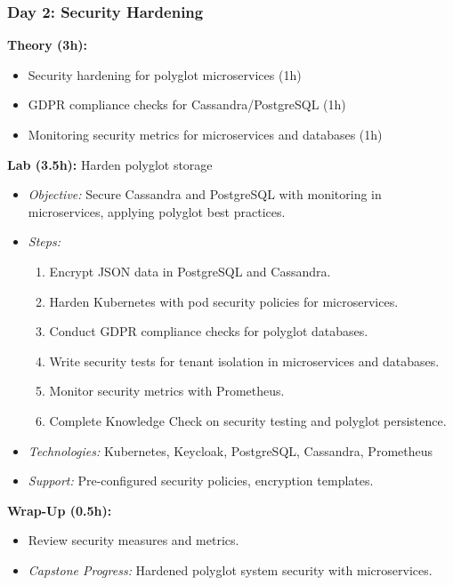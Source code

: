 \documentclass[11pt]{article}
\begin{document}
\subsubsection{Day 2: Security Hardening}
\textbf{Theory (3h):}
\begin{itemize}
    \item Security hardening for polyglot microservices (1h)
    \item GDPR compliance checks for Cassandra/PostgreSQL (1h)
    \item Monitoring security metrics for microservices and databases (1h)
\end{itemize}
\textbf{Lab (3.5h):} Harden polyglot storage
\begin{itemize}
    \item \textit{Objective:} Secure Cassandra and PostgreSQL with monitoring in microservices, applying polyglot best practices.
    \item \textit{Steps:}
        \begin{enumerate}
            \item Encrypt JSON data in PostgreSQL and Cassandra.
            \item Harden Kubernetes with pod security policies for microservices.
            \item Conduct GDPR compliance checks for polyglot databases.
            \item Write security tests for tenant isolation in microservices and databases.
            \item Monitor security metrics with Prometheus.
            \item Complete Knowledge Check on security testing and polyglot persistence.
        \end{enumerate}
    \item \textit{Technologies:} Kubernetes, Keycloak, PostgreSQL, Cassandra, Prometheus
    \item \textit{Support:} Pre-configured security policies, encryption templates.
\end{itemize}
\textbf{Wrap-Up (0.5h):}
\begin{itemize}
    \item Review security measures and metrics.
    \item \textit{Capstone Progress:} Hardened polyglot system security with microservices.
\end{itemize}
\end{document}
